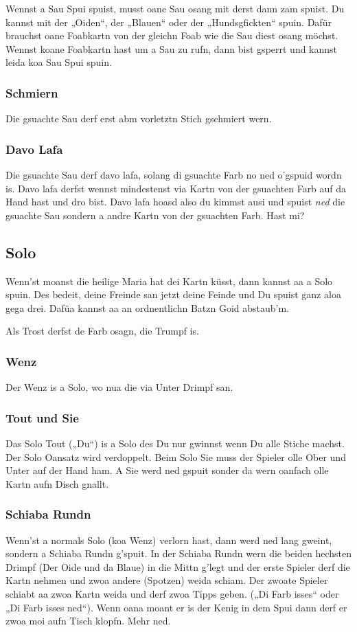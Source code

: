 \documentclass[11pt,a4paper]{scrartcl}		%
\begin{document}
		Wennst a Sau Spui spuist, musst oane Sau osang mit derst dann zam spuist. Du kannst mit der „Oiden“, der „Blauen“ oder der „Hundsgfickten“ spuin.
		Dafür brauchst oane Foabkartn von der gleichn Foab wie die Sau diest osang möchst. Wennst koane Foabkartn hast um a Sau zu rufn, dann bist gsperrt und kannst leida koa Sau Spui spuin.


			\subsubsection{Schmiern}
			Die gsuachte Sau derf erst abm vorletztn Stich gschmiert wern.

			\subsubsection{Davo Lafa}
			Die gsuachte Sau derf davo lafa, solang di gsuachte Farb no ned o'gspuid wordn is. Davo lafa derfst wennst mindestenst via Kartn von der gsuachten Farb auf da Hand hast und dro bist. Davo lafa hoasd also du kimmst ausi und spuist \emph{ned} die gsuachte Sau sondern a andre Kartn von der gsuachten Farb. Hast mi?

		
		\subsection{Solo}
		Wenn'st moanst die heilige Maria hat dei Kartn küsst, dann kannst aa a Solo spuin. Des bedeit, deine Freinde san jetzt deine Feinde und Du spuist ganz aloa gega drei. Dafüa kannst aa an ordnentlichn Batzn Goid abstaub'm.

		Als Trost derfst de Farb osagn, die Trumpf is. 		

			\subsubsection{Wenz}
			Der Wenz is a Solo, wo nua die via Unter Drimpf san.

			\subsubsection{Tout und Sie}
			Das Solo Tout („Du“) is a Solo des Du nur gwinnst wenn Du alle Stiche machst. Der Solo Oansatz wird verdoppelt.
			Beim Solo Sie muss der Spieler olle Ober und Unter auf der Hand ham. A Sie werd ned gspuit sonder da wern oanfach olle Kartn aufn Disch gnallt.

			\subsubsection{Schiaba Rundn}		
			Wenn'st a normals Solo (koa Wenz) verlorn hast, dann werd ned lang gweint, sondern a Schiaba Rundn g'spuit. In der Schiaba Rundn wern die beiden hechsten Drimpf (Der Oide und da Blaue) in die Mittn g'legt und der erste Spieler derf die Kartn nehmen und zwoa andere (Spotzen) weida schiam. Der zwoate Spieler schiabt aa zwoa Kartn weida und derf zwoa Tipps geben. („Di Farb isses“ oder „Di Farb isses ned“). 
			Wenn oana moant er is der Kenig in dem Spui dann derf er zwoa moi aufn Tisch klopfn. Mehr ned.
\end{document}
